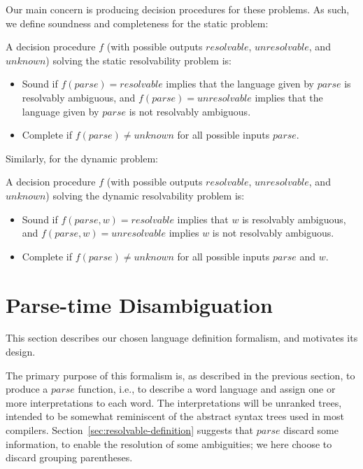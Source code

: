 \documentclass[acmsmall,review,anonymous]{acmart}\settopmatter{printfolios=true,printccs=false,printacmref=false}
\newcommand{\parse}{\mathit{parse}} %
\begin{document}
\noindent Our main concern is producing decision procedures for these problems. As such, we define soundness and completeness for the static problem:

\begin{definition}
  A decision procedure $f$ (with possible outputs $\mathit{resolvable}$, $\mathit{unresolvable}$, and $\mathit{unknown}$) solving the static resolvability problem is:
  \begin{itemize}
  \item Sound if $f(\parse) = \mathit{resolvable}$ implies that the language given by $\parse$ is resolvably ambiguous, and $f(\parse) = \mathit{unresolvable}$ implies that the language given by $\parse$ is not resolvably ambiguous.
  \item Complete if $f(\parse) \neq \mathit{unknown}$ for all possible inputs $\parse$.
  \end{itemize}
  \label{def:static-procedure}
\end{definition}

\noindent Similarly, for the dynamic problem:

\begin{definition}
  A decision procedure $f$ (with possible outputs $\mathit{resolvable}$, $\mathit{unresolvable}$, and $\mathit{unknown}$) solving the dynamic resolvability problem is:
  \begin{itemize}
  \item Sound if $f(\parse, w) = \mathit{resolvable}$ implies that $w$ is resolvably ambiguous, and $f(\parse, w) = \mathit{unresolvable}$ implies $w$ is not resolvably ambiguous.
  \item Complete if $f(\parse) \neq \mathit{unknown}$ for all possible inputs $\parse$ and $w$.
  \end{itemize}
  \label{def:dynamic-procedure}
\end{definition}

\section{Parse-time Disambiguation} \label{sec:parse-time-disambiguation}

This section describes our chosen language definition formalism, and motivates its design.

The primary purpose of this formalism is, as described in the previous section, to produce a $\parse$ function, i.e., to describe a word language and assign one or more interpretations to each word. The interpretations will be unranked trees, intended to be somewhat reminiscent of the abstract syntax trees used in most compilers. Section~\ref{sec:resolvable-definition} suggests that $\parse$ discard some information, to enable the resolution of some ambiguities; we here choose to discard grouping parentheses.
\end{document}
